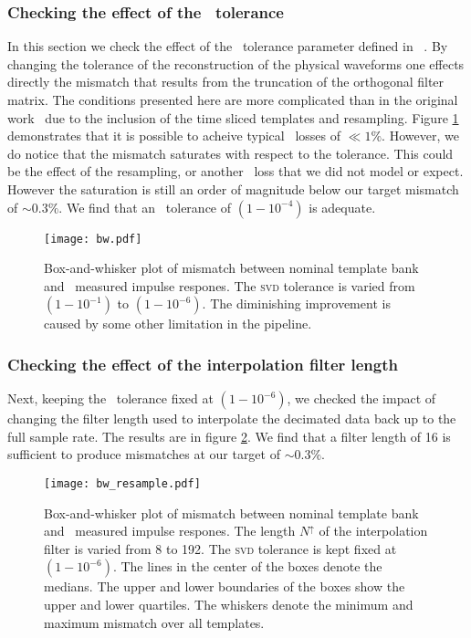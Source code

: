 \subsubsection{Checking the effect of the \SVD\ tolerance}

In this section we check the effect of the \SVD\ tolerance parameter defined in
~\cite{Cannon:2010p10398}.  By changing the tolerance of the reconstruction of
the physical waveforms one effects directly the mismatch that results from the
truncation of the orthogonal filter matrix.  The conditions presented here are
more complicated than in the original work~\cite{Cannon:2010p10398} due to the
inclusion of the time sliced templates and resampling.    Figure \ref{fig:hist-svd-tolerance}
demonstrates that it is possible to acheive typical \SNR\ losses of $\ll1\%$.
However, we do notice that the mismatch saturates with respect to the tolerance.
This could be the effect of the resampling, or another \SNR\ loss that we did
not model or expect.  However the saturation is still an order of magnitude below our target mismatch of $\sim 0.3 \%$.  We find that an \SVD\ tolerance of
$\left(1-10^{-4}\right)$ is adequate. 
%
\begin{figure}
	\begin{center}
		\texttt{[image: bw.pdf]}
		\caption{\label{fig:hist-svd-tolerance}
Box-and-whisker plot of mismatch between nominal
template bank and \lloid\ measured impulse respones.  The \textsc{svd}
tolerance is varied from $\left(1-10^{-1}\right)$ to $\left(1-10^{-6}\right)$.
The diminishing improvement is caused by some other limitation in the pipeline.}
	\end{center}
\end{figure}

\subsubsection{Checking the effect of the interpolation filter length}

Next, keeping the \SVD\ tolerance fixed at $\left(1-10^{-6}\right)$, we checked the
impact of changing the filter length used to interpolate the decimated data
back up to the full sample rate.  The results are in figure
\ref{fig:hist-interpolate}.  We find that a filter length of 16 is sufficient
to produce mismatches at our target of $\sim 0.3 \%$.
%
\begin{figure}
	\begin{center}
		\texttt{[image: bw\_resample.pdf]}
		\caption{\label{fig:hist-interpolate} Box-and-whisker plot of
mismatch between nominal template bank and \lloid\ measured impulse respones.
The length $N^\uparrow$ of the interpolation filter is varied from 8 to 192.
The \textsc{svd} tolerance is kept fixed at $(1-10^{-6})$.  The lines in the
center of the boxes denote the medians.  The upper and lower boundaries of the
boxes show the upper and lower quartiles.  The whiskers denote the minimum and
maximum mismatch over all templates.}
	\end{center}
\end{figure}



